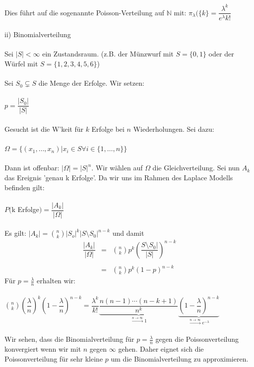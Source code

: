 \documentclass[10pt,a4paper]{report}
\numberwithin{equation}{section}
\numberwithin{figure}{section}
\theoremstyle{plain}
\theoremstyle{definition}
\theoremstyle{plain}
\theoremstyle{definition}
\theoremstyle{remark}
\theoremstyle{plain}
\begin{document}
Dies führt auf die sogenannte Poisson-Verteilung auf $\mathbb{N}$ mit: $\pi_\lambda(\{k\}=\dfrac{\lambda^k}{e^\lambda k!}$\\\\
ii) Binomialverteilung\\\\
Sei $|S|<\infty$ ein Zustandsraum. (z.B. der Münzwurf mit $S=\{0,1\}$ oder der Würfel mit $S=\{1,2,3,4,5,6\}$)\\\\
Sei $S_0 \subsetneq S$ die Menge der Erfolge. Wir setzen:\\\\
$p=\dfrac{|S_0|}{|S|}$\\\\
Gesucht ist die W'keit für $k$ Erfolge bei $n$ Wiederholungen. Sei  dazu:\\\\
$\Omega=\{(x_1,\dots,x_n)|x_i \in S \forall i \in \{1,\dots,n\}\}$\\\\
Dann ist offenbar: $|\Omega|=|S|^n$. Wir wählen auf $\Omega$ die Gleichverteilung. Sei nun $A_k$ das Ereignis 'genau k Erfolge'. Da wir uns im Rahmen des Laplace Modells befinden gilt:\\\\
$P($k Erfolge$)=\dfrac{|A_k|}{|\Omega|}$\\\\
Es gilt: $|A_k|=\binom{n}{k}|S_o|^k|S\setminus S_0|^{n-k}$ und damit
\begin{eqnarray*}
\dfrac{|A_k|}{|\Omega|}&=&\binom{n}{k}p^k\left(\dfrac{S\setminus S_0|}{|S|}\right)^{n-k}\\\\
&=&\binom{n}{k}p^k(1-p)^{n-k}
\end{eqnarray*}
Für $p=\frac{\lambda}{n}$ erhalten wir:\\\\
$\binom{n}{k}\left(\dfrac{\lambda}{n}\right)^k\left(1-\dfrac{\lambda}{n}\right)^{n-k}=\dfrac{\lambda^k}{k!}\underbrace{\dfrac{n(n-1)\cdots(n-k+1)}{n^k}}_{\overset{n \to \infty}{\rightarrow} 1}\underbrace{\left(1-\dfrac{\lambda}{n}\right)^{n-k}}_{\overset{n \to \infty}{\rightarrow} e^{-\lambda}}$\\\\
Wir sehen, dass die Binomialverteilung für $p=\frac{\lambda}{n}$ gegen die Poissonverteilung konvergiert wenn wir mit $n$ gegen $\infty$ gehen. Daher eignet sich die Poissonverteilung für sehr kleine $p$ um die Binomialverteilung zu approximieren.\\\\\\
\end{document}
